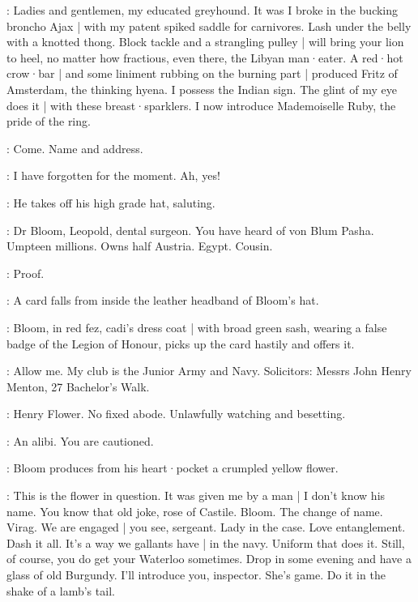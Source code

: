 \Maffei:
Ladies and gentlemen,
my educated greyhound.
It was I broke in the bucking broncho Ajax |
with my patent spiked saddle for carnivores.
Lash under the belly with a knotted thong.
Block tackle and a strangling pulley |
will bring your lion to heel,
no matter how fractious,
even  there,
the Libyan man·eater.
A red·hot crow·bar |
and some liniment rubbing on the burning part |
produced Fritz of Amsterdam,
the thinking hyena.
I possess the Indian sign.
The glint of my eye does it |
with these breast·sparklers.
I now introduce Mademoiselle Ruby,
the pride of the ring.

\FirstWatch[1]:
Come.
Name and address.

\Bloom:
I have forgotten for the moment.
Ah,
yes!

:
He takes off his high grade hat,
saluting.

\Bloom:
Dr Bloom,
Leopold,
dental surgeon.
You have heard of von Blum Pasha.
Umpteen millions.
Owns half Austria.
Egypt.
Cousin.

\FirstWatch:
Proof.

:
A card falls from inside the leather headband of Bloom's hat.

:
Bloom,
in red fez,
cadi's dress coat |
with broad green sash,
wearing a false badge of the Legion of Honour,
picks up the card hastily and offers it.

\Bloom:
Allow me.
My club is the Junior Army and Navy.
Solicitors:
Messrs John Henry Menton,
27 Bachelor's Walk.

\FirstWatch:
Henry Flower.
No fixed abode.
Unlawfully watching and besetting.

\SecondWatch[2]:
An alibi.
You are cautioned.

:
Bloom produces from his heart·pocket a crumpled yellow flower.

\Bloom:
This is the flower in question.
It was given me by a man |
I don't know his name.
You know that old joke,
rose of Castile.
Bloom.
The change of name.
Virag.
We are engaged |
you see,
sergeant.
Lady in the case.
Love entanglement.
Dash it all.
It's a way we gallants have |
in the navy.
Uniform that does it.
Still,
of course,
you do get your Waterloo sometimes.
Drop in some evening and have a glass of old Burgundy.
I'll introduce you,
inspector.
She's game.
Do it in the shake of a lamb's tail.

